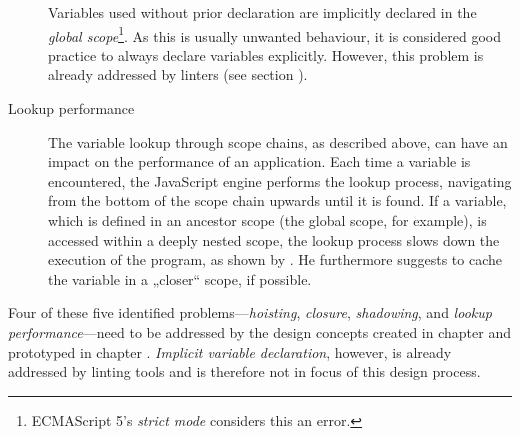 \begin{description}
Variables used without prior declaration are implicitly declared in the
\emph{global
scope}\footnote{ECMAScript 5’s \emph{strict mode} considers this an error.}.
As this is usually unwanted behaviour, it is considered good practice to
always declare variables explicitly. However, this problem is already
addressed by linters (see section ).
\item[Lookup performance]
The variable lookup through scope chains, as described above, can have
an impact on the performance of an application. Each time a variable is
encountered, the JavaScript engine performs the lookup process,
navigating from the bottom of the scope chain upwards until it is found.
If a variable, which is defined in an ancestor scope (the global scope,
for example), is accessed within a deeply nested scope, the lookup
process slows down the execution of the program, as shown by
. He furthermore suggests to cache the variable in
a „closer“ scope, if possible.
\end{description}

Four of these five identified problems—\emph{hoisting}, \emph{closure},
\emph{shadowing}, and \emph{lookup performance}—need to be addressed by
the design concepts created in chapter  and prototyped
in chapter . \emph{Implicit variable declaration},
however, is already addressed by linting tools and is therefore not in
focus of this design process.
